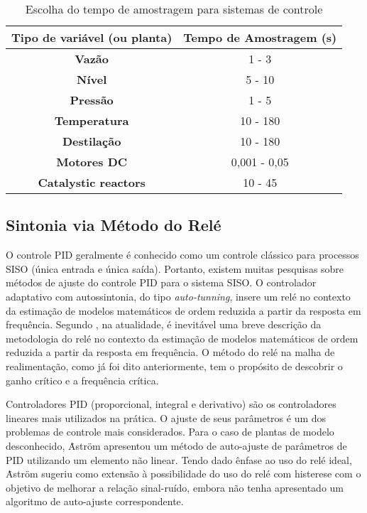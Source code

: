 \begin{table}[!htb]
\centering
\caption{\label{tab:ts_plants}Escolha do tempo de amostragem para sistemas de controle}


	\begin{tabular}{c|c}
	\textbf{Tipo de variável (ou planta)} & \textbf{Tempo de Amostragem (s)} \\ 
	\hline 
	\textbf{Vazão} & 1 - 3 \\ 
	\hline 
	\textbf{Nível} & 5 - 10 \\ 
	\hline 
	\textbf{Pressão} & 1 - 5 \\ 
	\hline 
	\textbf{Temperatura} & 10 - 180 \\ 
	\hline 
	\textbf{Destilação} & 10 - 180 \\ 
	\hline 
	\textbf{Motores DC} & 0,001 - 0,05 \\ 
	\hline 
	\textbf{Catalystic reactors} & 10 - 45 \\ 
	\end{tabular} 
\end{table}
	
	
	\subsection{Sintonia via Método do Relé}
	O controle PID geralmente é conhecido como um controle clássico para processos SISO (única entrada e única saída). Portanto, existem muitas pesquisas sobre métodos de ajuste do controle PID para o sistema SISO.
	O controlador adaptativo com autossintonia, do tipo \emph{auto-tunning}, insere um relé no contexto da estimação de modelos matemáticos de ordem reduzida a partir da resposta em frequência. Segundo , na atualidade, é inevitável uma breve descrição da metodologia do relé no contexto da estimação de modelos matemáticos de ordem reduzida a partir da resposta em frequência.
	O método do relé na malha de realimentação, como já foi dito anteriormente, tem o propósito de descobrir o ganho crítico e a frequência crítica.
	
	Controladores PID (proporcional, integral e derivativo) são os controladores lineares mais utilizados na prática. O ajuste de seus parâmetros é um dos problemas de controle mais considerados. Para o caso de plantas de modelo desconhecido, \.{A}str\"{o}m apresentou um método de auto-ajuste de parâmetros de PID utilizando um elemento não linear. Tendo dado ênfase ao uso do relé ideal, \.{A}str\"{o}m sugeriu como extensão à possibilidade do uso do relé com histerese com o objetivo de melhorar a relação sinal-ruído, embora não tenha apresentado um algoritmo de auto-ajuste correspondente.
	
